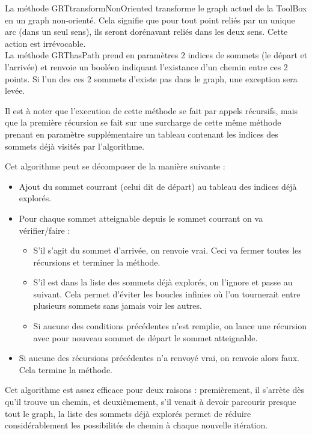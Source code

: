 		La méthode GRTtransformNonOriented transforme le graph actuel de la ToolBox en un graph non-orienté. Cela signifie que pour tout point reliés par un unique arc (dans un seul sens), ils seront dorénavant reliés dans les deux sens. Cette action est irrévocable.\\
		
		La méthode GRThasPath prend en paramètres 2 indices de sommets (le départ et l'arrivée) et renvoie un booléen indiquant l'existance d'un chemin entre ces 2 points. Si l'un des ces 2 sommets d'existe pas dans le graph, une exception sera levée.
		
		Il est à noter que l'execution de cette méthode se fait par appels récursifs, mais que la première récursion se fait sur une surcharge de cette même méthode prenant en paramètre supplémentaire un tableau contenant les indices des sommets déjà visités par l'algorithme.
		
		Cet algorithme peut se décomposer de la manière suivante :
		\begin{itemize}
			\item Ajout du sommet courrant (celui dit de départ) au tableau des indices déjà explorés.
			\item Pour chaque sommet atteignable depuis le sommet courrant on va vérifier/faire :
			\begin{itemize}
				\item S'il s'agit du sommet d'arrivée, on renvoie vrai. Ceci va fermer toutes les récursions et terminer la méthode.
				\item S'il est dans la liste des sommets déjà explorés, on l'ignore et passe au suivant. Cela permet d'éviter les boucles infinies où l'on tournerait entre plusieurs sommets sans jamais voir les autres.
				\item Si aucune des conditions précédentes n'est remplie, on lance une récursion avec pour nouveau sommet de départ le sommet atteignable.
			\end{itemize}
			\item Si aucune des récursions précédentes n'a renvoyé vrai, on renvoie alors faux. Cela termine la méthode.\\
		\end{itemize}
		Cet algorithme est assez efficace pour deux raisons : premièrement, il s'arrète dès qu'il trouve un chemin, et deuxièmement, s'il venait à devoir parcourir presque tout le graph, la liste des sommets déjà explorés permet de réduire considérablement les possibilités de chemin à chaque nouvelle itération.\\
		

